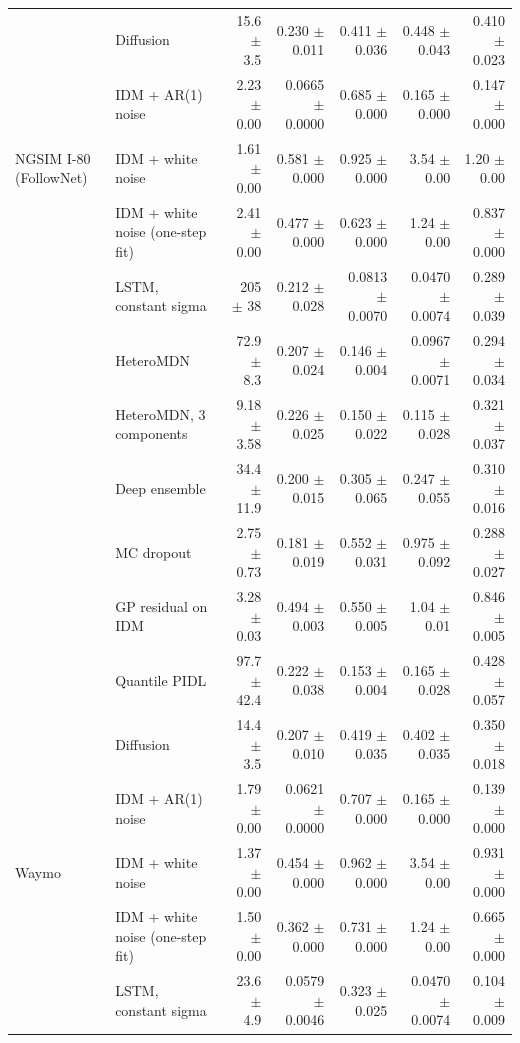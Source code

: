 \begin{longtable}{llrrrrr}
 & Diffusion & 15.6 $\pm$ 3.5 & 0.230 $\pm$ 0.011 & 0.411 $\pm$ 0.036 & 0.448 $\pm$ 0.043 & 0.410 $\pm$ 0.023 \\
 & IDM + AR(1) noise & 2.23 $\pm$ 0.00 & 0.0665 $\pm$ 0.0000 & 0.685 $\pm$ 0.000 & 0.165 $\pm$ 0.000 & 0.147 $\pm$ 0.000 \\
\midrule
NGSIM I-80 (FollowNet) & IDM + white noise & 1.61 $\pm$ 0.00 & 0.581 $\pm$ 0.000 & 0.925 $\pm$ 0.000 & 3.54 $\pm$ 0.00 & 1.20 $\pm$ 0.00 \\
 & IDM + white noise (one-step fit) & 2.41 $\pm$ 0.00 & 0.477 $\pm$ 0.000 & 0.623 $\pm$ 0.000 & 1.24 $\pm$ 0.00 & 0.837 $\pm$ 0.000 \\
 & LSTM, constant sigma & 205 $\pm$ 38 & 0.212 $\pm$ 0.028 & 0.0813 $\pm$ 0.0070 & 0.0470 $\pm$ 0.0074 & 0.289 $\pm$ 0.039 \\
 & HeteroMDN & 72.9 $\pm$ 8.3 & 0.207 $\pm$ 0.024 & 0.146 $\pm$ 0.004 & 0.0967 $\pm$ 0.0071 & 0.294 $\pm$ 0.034 \\
 & HeteroMDN, 3 components & 9.18 $\pm$ 3.58 & 0.226 $\pm$ 0.025 & 0.150 $\pm$ 0.022 & 0.115 $\pm$ 0.028 & 0.321 $\pm$ 0.037 \\
 & Deep ensemble & 34.4 $\pm$ 11.9 & 0.200 $\pm$ 0.015 & 0.305 $\pm$ 0.065 & 0.247 $\pm$ 0.055 & 0.310 $\pm$ 0.016 \\
 & MC dropout & 2.75 $\pm$ 0.73 & 0.181 $\pm$ 0.019 & 0.552 $\pm$ 0.031 & 0.975 $\pm$ 0.092 & 0.288 $\pm$ 0.027 \\
 & GP residual on IDM & 3.28 $\pm$ 0.03 & 0.494 $\pm$ 0.003 & 0.550 $\pm$ 0.005 & 1.04 $\pm$ 0.01 & 0.846 $\pm$ 0.005 \\
 & Quantile PIDL & 97.7 $\pm$ 42.4 & 0.222 $\pm$ 0.038 & 0.153 $\pm$ 0.004 & 0.165 $\pm$ 0.028 & 0.428 $\pm$ 0.057 \\
 & Diffusion & 14.4 $\pm$ 3.5 & 0.207 $\pm$ 0.010 & 0.419 $\pm$ 0.035 & 0.402 $\pm$ 0.035 & 0.350 $\pm$ 0.018 \\
 & IDM + AR(1) noise & 1.79 $\pm$ 0.00 & 0.0621 $\pm$ 0.0000 & 0.707 $\pm$ 0.000 & 0.165 $\pm$ 0.000 & 0.139 $\pm$ 0.000 \\
\midrule
Waymo & IDM + white noise & 1.37 $\pm$ 0.00 & 0.454 $\pm$ 0.000 & 0.962 $\pm$ 0.000 & 3.54 $\pm$ 0.00 & 0.931 $\pm$ 0.000 \\
 & IDM + white noise (one-step fit) & 1.50 $\pm$ 0.00 & 0.362 $\pm$ 0.000 & 0.731 $\pm$ 0.000 & 1.24 $\pm$ 0.00 & 0.665 $\pm$ 0.000 \\
 & LSTM, constant sigma & 23.6 $\pm$ 4.9 & 0.0579 $\pm$ 0.0046 & 0.323 $\pm$ 0.025 & 0.0470 $\pm$ 0.0074 & 0.104 $\pm$ 0.009 \\

\end{longtable}
